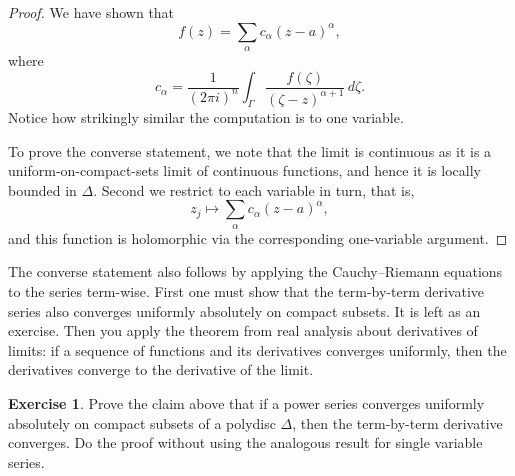 \documentclass[12pt,openany]{book}
\newcommand{\abs}[1]{\left\lvert {#1} \right\rvert}
\theoremstyle{plain}
\theoremstyle{remark}
\theoremstyle{definition}
\newenvironment{exbox}{%
    \def\FrameCommand{\vrule width 1pt \relax\hspace {10pt}}%
    \MakeFramed {\advance \hsize -\width \FrameRestore }%
}{%
    \endMakeFramed
}
\theoremstyle{exercise}
\newtheorem{exercise}{Exercise}[section]
\theoremstyle{example}
\begin{document}
\begin{proof}
We have shown that
\begin{equation*}
f(z) =
\sum_{\alpha}
c_{\alpha}
{(z-a)}^{\alpha} ,
\end{equation*}
where
\begin{equation*}
c_\alpha
=
\frac{1}{{(2\pi i)}^n}
\int_{\Gamma}
\frac{f(\zeta)}{{(\zeta-z)}^{\alpha+1}}
\,
d \zeta .
\end{equation*}
Notice how strikingly similar the computation is to one variable.


To prove the converse statement,
we note that the limit
is continuous as it is a uniform-on-compact-sets limit of continuous
functions, and hence it is locally bounded in $\Delta$.  Second
we restrict to each variable in turn, that is,
\begin{equation*}
z_j \mapsto \sum_{\alpha} c_\alpha {(z-a)}^\alpha ,
\end{equation*}
and this function is holomorphic via the corresponding one-variable argument.
\end{proof}

The converse statement also follows by applying the Cauchy--Riemann equations to the series
term-wise.  First one must show that the term-by-term derivative
series also converges uniformly absolutely on compact subsets.  It is left as an
exercise.  Then you apply the theorem from real analysis about derivatives
of limits: if a sequence of functions and its derivatives converges
uniformly, then the derivatives converge to the derivative of the limit.

\begin{exbox}
\begin{exercise}
Prove the claim above that if a power series converges uniformly absolutely
on compact subsets of a polydisc $\Delta$, then the term-by-term derivative
converges.
Do the proof without using the analogous result for single variable series.
\end{exercise}
\end{exbox}
\end{document}
